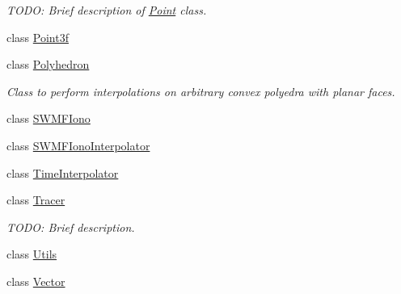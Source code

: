 \begin{DoxyCompactItemize}
\begin{DoxyCompactList}\small\item\em T\-O\-D\-O\-: Brief description of \hyperlink{classccmc_1_1_point}{Point} class. \end{DoxyCompactList}\item 
class \hyperlink{classccmc_1_1_point3f}{Point3f}
\item 
class \hyperlink{classccmc_1_1_polyhedron}{Polyhedron}
\begin{DoxyCompactList}\small\item\em Class to perform interpolations on arbitrary convex polyedra with planar faces. \end{DoxyCompactList}\item 
class \hyperlink{classccmc_1_1_s_w_m_f_iono}{S\-W\-M\-F\-Iono}
\item 
class \hyperlink{classccmc_1_1_s_w_m_f_iono_interpolator}{S\-W\-M\-F\-Iono\-Interpolator}
\item 
class \hyperlink{classccmc_1_1_time_interpolator}{Time\-Interpolator}
\item 
class \hyperlink{classccmc_1_1_tracer}{Tracer}
\begin{DoxyCompactList}\small\item\em T\-O\-D\-O\-: Brief description. \end{DoxyCompactList}\item 
class \hyperlink{classccmc_1_1_utils}{Utils}
\item 
class \hyperlink{classccmc_1_1_vector}{Vector}
\end{DoxyCompactItemize}
